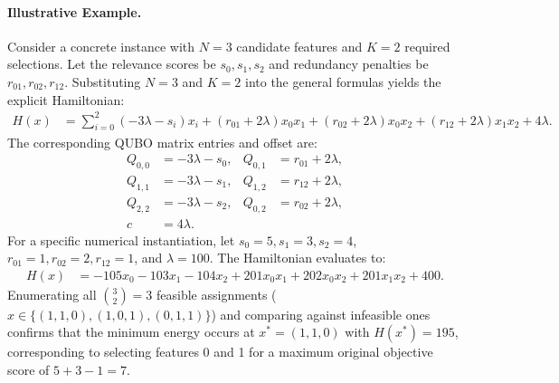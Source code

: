 \documentclass[12pt]{article}
\begin{document}
\paragraph{Illustrative Example.}
Consider a concrete instance with $N=3$ candidate features and $K=2$ required selections. Let the relevance scores be $s_0, s_1, s_2$ and redundancy penalties be $r_{01}, r_{02}, r_{12}$. Substituting $N=3$ and $K=2$ into the general formulas yields the explicit Hamiltonian:
\begin{align}
  H(x) &= \sum_{i=0}^{2} \left( -3\lambda - s_i \right) x_i + \left( r_{01} + 2\lambda \right) x_0 x_1 + \left( r_{02} + 2\lambda \right) x_0 x_2 + \left( r_{12} + 2\lambda \right) x_1 x_2 + 4\lambda.
\end{align}
The corresponding QUBO matrix entries and offset are:
\begin{align}
  Q_{0,0} &= -3\lambda - s_0, & Q_{0,1} &= r_{01} + 2\lambda, \\
  Q_{1,1} &= -3\lambda - s_1, & Q_{1,2} &= r_{12} + 2\lambda, \\
  Q_{2,2} &= -3\lambda - s_2, & Q_{0,2} &= r_{02} + 2\lambda, \\
  c &= 4\lambda.
\end{align}
For a specific numerical instantiation, let $s_0=5, s_1=3, s_2=4$, $r_{01}=1, r_{02}=2, r_{12}=1$, and $\lambda=100$. The Hamiltonian evaluates to:
\begin{align}
  H(x) &= -105 x_0 - 103 x_1 - 104 x_2 + 201 x_0 x_1 + 202 x_0 x_2 + 201 x_1 x_2 + 400.
\end{align}
Enumerating all $\binom{3}{2}=3$ feasible assignments ($x \in \{(1,1,0), (1,0,1), (0,1,1)\}$) and comparing against infeasible ones confirms that the minimum energy occurs at $x^* = (1,1,0)$ with $H(x^*) = 195$, corresponding to selecting features 0 and 1 for a maximum original objective score of $5+3-1=7$.
\end{document}
